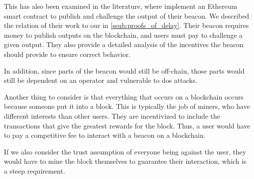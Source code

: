 This has also been examined in the literature, where \citet{bunz2017proofsof} implement an Ethereum smart contract to publish and challenge the output of their beacon.
We described the relation of their work to our in \vref{ssub:proofs_of_delay}.
Their beacon requires money to publish outputs on the blockchain, and users must pay to challenge a given output.
They also provide a detailed analysis of the incentives the beacon should provide to ensure correct behavior.

In addition, since parts of the beacon would still be off-chain, those parts would still be dependent on an operator and vulnerable to \acrshort{dos} attacks.

Another thing to consider is that everything that occurs on a blockchain occurs because someone put it into a block.
This is typically the job of miners, who have different interests than other users.
They are incentivized to include the transactions that give the greatest rewards for the block.
Thus, a user would have to pay a competitive fee to interact with a beacon on a blockchain.

If we also consider the trust assumption of everyone being against the user, they would have to mine the block themselves to guarantee their interaction, which is a steep requirement.
